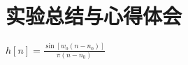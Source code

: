 \documentclass{../source/Experiment}
\begin{document}
            \subsubsection{}
            \subsubsection{}
            \subsubsection{}
            \subsubsection{}

    \section{实验总结与心得体会}
    $h[n]=\frac{\sin \left[w_{0}\left(n-n_{0}\right)\right]}{\pi\left(n-n_{0}\right)}$
\end{document}

